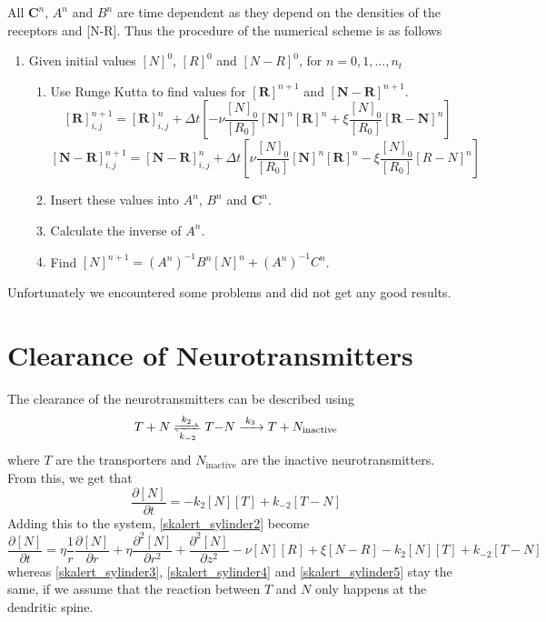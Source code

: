 \documentclass{article}
\begin{document}
All $\boldsymbol{C}^n$, $A^n$ and $B^n$ are time dependent as they depend on the densities of the receptors and [N-R]. Thus the procedure of the numerical scheme is as follows 
\begin{enumerate}
    \item Given initial values $[N]^0$, $[R]^0$ and $[N-R]^0$, for $n = 0, 1, ..., n_t$
    \begin{enumerate}
        \item Use Runge Kutta to find values for  $\boldsymbol{[R]}^{n+1}$ and $\boldsymbol{[N-R]}^{n+1}$. \begin{equation}
            \boldsymbol{[R]}^{n+1}_{i,j} = \boldsymbol{[R]}^{n}_{i,j} + \Delta t \left[- \nu \frac{[N]_0}{[R_0]} \boldsymbol{[N]}^{n} \boldsymbol{[R]}^{n} + \xi \frac{[N]_0}{[R_0]} \boldsymbol{[R-N]}^{n} \right]
        \end{equation} 
        \begin{equation}
            \boldsymbol{[N-R]}^{n+1}_{i,j} = \boldsymbol{[N-R]}^{n}_{i,j} + \Delta t \left[ \nu \frac{[N]_0}{[R_0]} \boldsymbol{[N]}^{n} \boldsymbol{[R]}^{n} - \xi \frac{[N]_0}{[R_0]} [R-N]^{n} \right]
        \end{equation} 
        \item Insert these values into $A^n$, $B^n$ and $\boldsymbol{C}^n$.
        \item Calculate the inverse of $A^n$. 
        \item Find $[N]^{n+1} = (A^n)^{-1} B^n [N]^{n} + (A^n)^{-1}C^n$.  
    \end{enumerate}
\end{enumerate}
Unfortunately we encountered some problems and did not get any good results.


\section{Clearance of Neurotransmitters}
The clearance of the neurotransmitters can be described using
\begin{equation*}
\ce{$T$ + $N$ <=>[$k_2$][$k_{-2}$] $T-N$ ->[$k_3$] $T$ + $N_{\text{inactive}}$}
\end{equation*}
where $T$ are the transporters and $N_{\text{inactive}}$ are the inactive neurotransmitters. From this, we get that
\begin{equation*}
    \frac{\partial [N]}{\partial t} = - k_2 [N][T] + k_{-2} [T-N]
\end{equation*}
Adding this to the system, \eqref{skalert_sylinder2} become
\begin{equation}
    \frac{\partial [N]}{\partial t} = 
    \eta \frac{1}{r} \frac{\partial [N]}{\partial r} +\eta  \frac{\partial^2 [N]}{\partial r^2}  +  \frac{\partial^2 [N]}{\partial z^2} -  \nu [N] [R] +  \xi [N-R] - k_2 [N][T] + k_{-2} [T-N]
\end{equation}
whereas \eqref{skalert_sylinder3}, \eqref{skalert_sylinder4} and \eqref{skalert_sylinder5} stay the same, if we assume that the reaction between $T$ and $N$ only happens at the dendritic spine.
\end{document}
